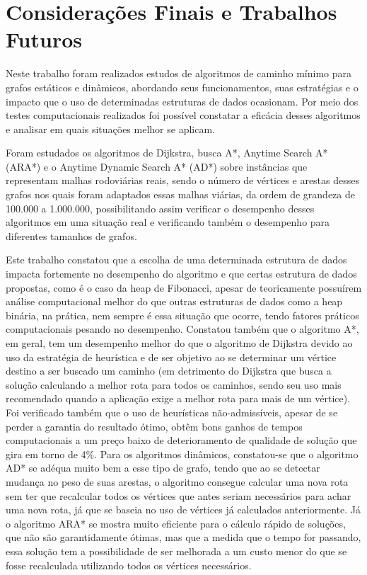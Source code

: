 \chapter{Considerações Finais e Trabalhos Futuros}
\label{sec-conclusao}

Neste trabalho foram realizados estudos de algoritmos de caminho mínimo para grafos estáticos e dinâmicos, abordando seus funcionamentos, suas estratégias e o impacto que o uso de determinadas estruturas de dados ocasionam. Por meio dos testes computacionais realizados foi possível constatar a eficácia desses algoritmos e analisar em quais situações melhor se aplicam.

Foram estudados os algoritmos de Dijkstra, busca A*, Anytime Search A* (ARA*) e o Anytime Dynamic Search A* (AD*) sobre instâncias que representam malhas rodoviárias reais, sendo o número de vértices e arestas desses grafos nos quais foram adaptados essas malhas viárias, da ordem de grandeza de 100.000 a 1.000.000, possibilitando assim verificar o desempenho desses algoritmos em uma situação real e verificando também o desempenho para diferentes tamanhos de grafos.

Este trabalho constatou que a escolha de uma determinada estrutura de dados impacta fortemente no desempenho do algoritmo e que certas estrutura de dados propostas, como é o caso da heap de Fibonacci, apesar de teoricamente possuírem análise computacional melhor do que outras estruturas de dados como a heap binária, na prática, nem sempre é essa situação que ocorre, tendo fatores práticos computacionais pesando no desempenho. Constatou também que o algoritmo A*, em geral, tem um desempenho melhor do que o algoritmo de Dijkstra devido ao uso da estratégia de heurística e de ser objetivo ao se determinar um vértice destino a ser buscado um caminho (em detrimento do Dijkstra que busca a solução calculando a melhor rota para todos os caminhos, sendo seu uso mais recomendado quando a aplicação exige a melhor rota para mais de um vértice). Foi verificado também que o uso de heurísticas não-admissíveis, apesar de se perder a garantia do resultado ótimo, obtêm bons ganhos de tempos computacionais a um preço baixo de deterioramento de qualidade de solução que gira em torno de 4\%. Para os algoritmos dinâmicos, constatou-se que o algoritmo AD* se adéqua muito bem a esse tipo de grafo, tendo que ao se detectar mudança no peso de suas arestas, o algoritmo consegue calcular uma nova rota sem ter que recalcular todos os vértices que antes seriam necessários para achar uma nova rota, já que se baseia no uso de vértices já calculados anteriormente. Já o algoritmo ARA* se mostra muito eficiente para o cálculo rápido de soluções, que não são garantidamente ótimas, mas que a medida que o tempo for passando, essa solução tem a possibilidade de ser melhorada a um custo menor do que se fosse recalculada utilizando todos os vértices necessários.

